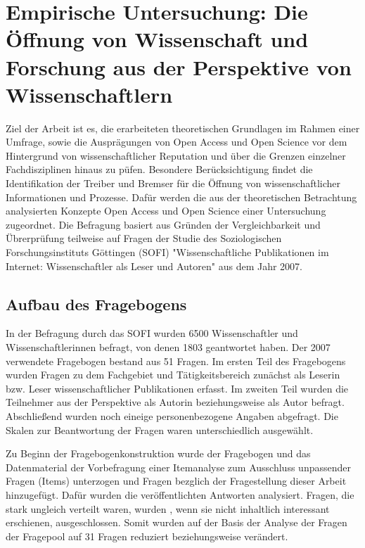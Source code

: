 \chapter{Empirische Untersuchung: Die Öffnung von Wissenschaft und Forschung aus der Perspektive von Wissenschaftlern}

Ziel der Arbeit ist es, die erarbeiteten theoretischen Grundlagen im Rahmen einer Umfrage, sowie die Ausprägungen von Open Access und Open Science vor dem Hintergrund von wissenschaftlicher Reputation und über die Grenzen einzelner Fachdisziplinen hinaus zu püfen. Besondere Berücksichtigung findet die Identifikation der Treiber und Bremser für die Öffnung von wissenschaftlicher Informationen und Prozesse. Dafür werden die aus der theoretischen Betrachtung analysierten Konzepte Open Access und Open Science einer Untersuchung zugeordnet. Die Befragung basiert aus Gründen der Vergleichbarkeit und Übrerprüfung teilweise auf Fragen der Studie des Soziologischen Forschungsinstituts Göttingen (SOFI) "Wissenschaftliche Publikationen im Internet: Wissenschaftler als Leser und Autoren" aus dem Jahr 2007.

\section{Aufbau des Fragebogens}
In der Befragung durch das SOFI wurden 6500 Wissenschaftler und Wissenschaftlerinnen befragt, von denen 1803 geantwortet haben. Der 2007 verwendete Fragebogen bestand aus 51 Fragen. Im ersten Teil des Fragebogens wurden Fragen zu dem Fachgebiet und Tätigkeitsbereich zunächst als Leserin bzw. Leser wissenschaftlicher Publikationen erfasst. Im zweiten Teil wurden die Teilnehmer aus der Perspektive als Autorin beziehungsweise als Autor befragt. Abschließend wurden noch eineige personenbezogene Angaben abgefragt. \cite{Hanekop_Wittke_2007_Fragebogen} Die Skalen zur Beantwortung der Fragen waren unterschiedlich ausgewählt. 

Zu Beginn der Fragebogenkonstruktion wurde der Fragebogen und das Datenmaterial der Vorbefragung einer Itemanalyse zum Ausschluss unpassender Fragen (Items) unterzogen und Fragen bezglich der Fragestellung dieser Arbeit hinzugefügt. Dafür wurden die veröffentlichten Antworten analysiert. Fragen, die stark ungleich verteilt waren, wurden , wenn sie nicht inhaltlich interessant erschienen, ausgeschlossen.  Somit wurden auf der Basis der Analyse der Fragen der Fragepool auf 31 Fragen reduziert beziehungsweise verändert.

